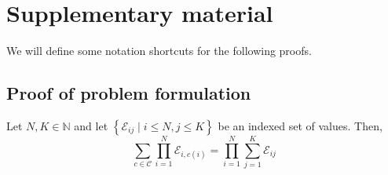 \chapter{Supplementary material}\label{sec:something}

We will define some notation shortcuts for the following proofs.



\section{Proof of problem formulation}\label{sec:proofs}

\begin{lemma} 
    
    Let $N, K \in \mathbb{N}$ and let $\left\{\mathcal{E}_{i j} \mid i \leq N, j \leq K\right\}$ be an indexed set of values. Then,
    $$
    \sum_{c \in \mathcal{C}} \prod_{i=1}^N \mathcal{E}_{i, c(i)}=\prod_{i=1}^N \sum_{j=1}^K \mathcal{E}_{i j}
    $$
\end{lemma}

